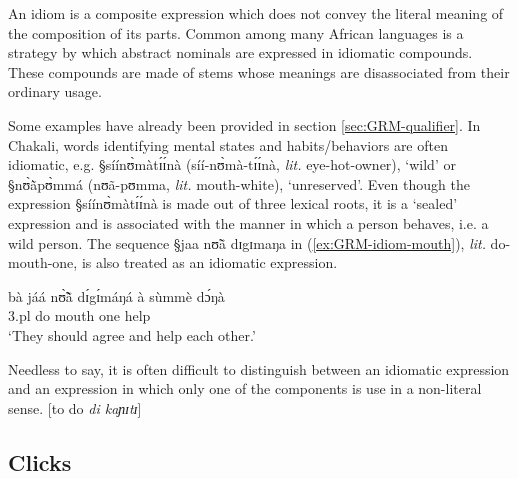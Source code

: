 \begin{exe}
\begin{exe}
\begin{exe}
{\begin{exe}
\begin{exe}
\begin{exe}
\begin{exe}
\begin{exe}
\begin{exe}
\begin{exe}
\begin{xlist}
\begin{exe}
\begin{exe}
\begin{exe}
\begin{exe}
\begin{exe}
\begin{exe}
\begin{exe}
\begin{exe}
\begin{exe}
\begin{exe}
\begin{exe}
\begin{exe}
\begin{exe}
\begin{exe}
\begin{exe}
An idiom is a  composite expression which does not convey the literal  meaning 
of the composition  of its parts. Common among many African languages is a 
strategy by which  abstract nominals are expressed in idiomatic compounds. 
These compounds are made of stems whose meanings are disassociated from their 
ordinary usage.


Some examples have already been provided in section \ref{sec:GRM-qualifier}. In 
Chakali, words identifying mental states and habits/behaviors are often 
idiomatic, e.g. {\S síínʊ̀màtɪ́ɪ́nà} ({síí-nʊ̀mà-tɪ́ɪ́nà}, {\it lit.} 
eye-hot-owner), `wild' or {\S nʊ̀ã̀pʊ̀mmá} ({nʊã-pʊmma}, {\it lit.} 
mouth-white), `unreserved'. Even though the expression {\S síínʊ̀màtɪ́ɪ́nà} 
is made out of three lexical roots, it is a `sealed' expression and is 
associated with the manner in which a person behaves, i.e. a wild person. The 
sequence {\S jaa nʊ̃ã dɪgɪmaŋa} in (\ref{ex:GRM-idiom-mouth}), {\it lit.} 
do-mouth-one,  is also treated as an idiomatic expression.

\ea\label{ex:GRM-idiom-mouth}
   \gll   bà jáá nʊ̃̀ã̀ dɪ́gɪ́máŋá à sùmmè dɔ́ŋà\\
{\sc 3.pl} do mouth one {\conn} help {\recp} \\
\glt `They should agree and help each other.'

\z

Needless to say, it is often difficult to  distinguish between an idiomatic
expression and  an expression in which only one of the  components is use in a
 non-literal sense. [to do {\it di kaɲɪtɪ}]
 
 






\subsection{Clicks}
\label{sec:GRM-greet}


\end{exe}
\end{exe}
\end{exe}
\end{exe}
\end{exe}
\end{exe}
\end{exe}
\end{exe}
\end{exe}
\end{exe}
\end{exe}
\end{exe}
\end{exe}
\end{exe}
\end{exe}
\end{xlist}
\end{exe}
\end{exe}
\end{exe}
\end{exe}
\end{exe}
\end{exe}
\end{exe}}
\end{exe}
\end{exe}
\end{exe}
